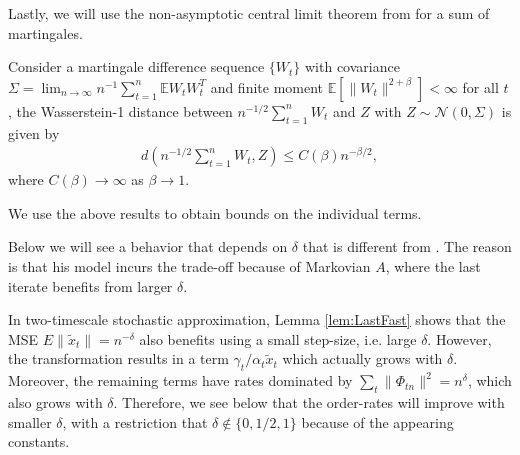 Lastly, we will use the non-asymptotic central limit theorem from \citep{srikant2024CLT} for a sum of martingales.
\begin{lemma}\label{lem:CLT}
    Consider a martingale difference sequence $\{W_t\}$ with covariance $\Sigma = \lim_{n \to \infty} n^{-1} \sum_{t=1}^n \mathbb{E}W_t W_t^T$ and finite moment $\mathbb{E}[\lVert W_t \rVert^{2 + \beta}] < \infty$ for all $t$, the Wasserstein-1 distance between $n^{-1/2} \sum_{t=1}^n W_t$ and $Z$ with $Z \sim \mathcal{N}(0, \Sigma)$ is given by
    \begin{align*}
        d\left(n^{-1/2} \sum_{t=1}^n W_t, Z\right) \leq C(\beta) n^{-\beta / 2} ,
    \end{align*}
    where $C(\beta) \to \infty$ as $\beta \to 1$.
\end{lemma}
We use the above results to obtain bounds on the individual terms.
\begin{remark}
    Below we will see a behavior that depends on $\delta$ that is different from \citep{srikant2024CLT}. 
    The reason is that his model incurs the trade-off because of Markovian $A$, where the last iterate benefits from larger $\delta$.

    In two-timescale stochastic approximation, Lemma \ref{lem:LastFast} shows that the MSE $E\lVert \tilde{x}_t \rVert = n^{-\delta}$ also benefits using a small step-size, i.e. large $\delta$.
    However, the transformation results in a term $\gamma_t / \alpha_t \tilde{x}_t$ which actually grows with $\delta$.
    Moreover, the remaining terms have rates dominated by $\sum_t \lVert \Phi_{tn} \rVert^2 = n^\delta$, which also grows with $\delta$.
    Therefore, we see below that the order-rates will improve with smaller $\delta$, with a restriction that $\delta \not \in \{0, 1/2, 1\}$ because of the appearing constants.
\end{remark}




